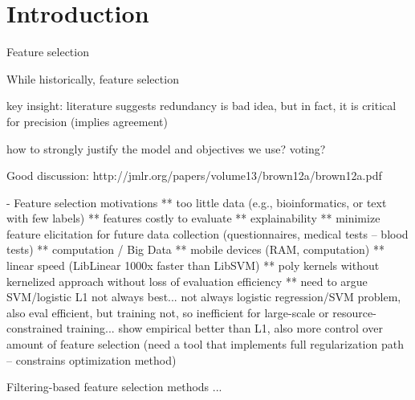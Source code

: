 \section{Introduction}

Feature selection~\cite{guyon_jmlr03} 

While historically, feature selection 

\COMMENT
key insight: literature suggests redundancy is bad idea, but in fact, it is critical for precision (implies agreement)

how to strongly justify the model and objectives we use?  voting?

Good discussion: http://jmlr.org/papers/volume13/brown12a/brown12a.pdf

- Feature selection motivations
** too little data (e.g., bioinformatics, or text with few labels)
** features costly to evaluate
** explainability
** minimize feature elicitation for future data collection (questionnaires, medical tests -- blood tests)
** computation / Big Data
** mobile devices (RAM, computation)
** linear speed (LibLinear 1000x faster than LibSVM)
** poly kernels without kernelized approach without loss of evaluation efficiency
** need to argue SVM/logistic L1 not always best... not always logistic regression/SVM problem, also eval efficient, but training not, so 
inefficient for large-scale or resource-constrained training... show empirical better than L1, also more control over amount of feature 
selection (need a tool that implements full regularization path -- constrains optimization method)


Filtering-based feature selection methods ...



